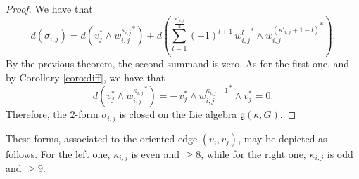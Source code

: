 \documentclass[a4paper,11pt]{amsart}
\theoremstyle{definition}
\theoremstyle{remark}
\numberwithin{equation}{section}
\newcommand{\g}{\mathfrak{g}}
\begin{document}
\begin{proof}
We have that
\[
d(\sigma_{i,j}) = d( v_j^* \wedge {w_{i,j}^{\kappa_{i,j}}}^*) + d \left(\sum_{l=1}^{\frac{\kappa'_{i,j}}2}  (-1)^{l+1}\, {w_{i,j}^{l}}^* \wedge {w_{i,j}^{(\kappa'_{i,j}+1-l)}}^*\right).
\]
By the previous theorem, the second summand is zero. 
As for the first one, and by Corollary \ref{coro:diff}, we have that
\[
d( v_j^* \wedge {w_{i,j}^{\kappa_{i,j}}}^*) = -  \,v_j^* \wedge {w_{i,j}^{\kappa_{i,j}-1}}^*\wedge v_j^* = 0.
\]
Therefore, the \(2\)-form \(\sigma_{i,j}\) is closed on the Lie algebra \(\g(\kappa,G)\).
\end{proof}


These forms, associated to the oriented edge \((v_i,v_j)\), may be depicted as follows. 
For the left one, $\kappa_{i,j}$ is even and $\ge 8$, while for the right one, $\kappa_{i,j}$ is odd and $\ge 9$.


\medskip
\end{document}
